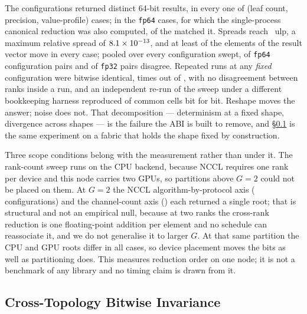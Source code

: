 \documentclass[journal,10pt]{IEEEtran}
\theoremstyle{plain}
\theoremstyle{definition}
\theoremstyle{remark}
\newcommand{\sv}[1]{\texttt{#1}}
\begin{document}
The \GpuWorldSizes{} configurations returned \GpuRootsDistinct{} distinct
64-bit results, in every one of \GpuCases{} (leaf count, precision,
value-profile) cases; in the \GpuCanonCases{} \sv{fp64} cases, for which the
single-process canonical reduction was also computed, \GpuEqCanonical{} of the
\GpuWorldSizes{} matched it. Spreads reach \GpuUlpMax{}~ulp, a maximum
relative spread of $8.1\times10^{-13}$, and at least \GpuElemsMovedMin{} of the
\GpuElemsTotal{} elements of the result vector move in every case; pooled over
every configuration swept, \GpuPairDblPct{} of \sv{fp64} configuration pairs
and \GpuPairSglPct{} of \sv{fp32} pairs disagree. Repeated runs at any \emph{fixed} configuration
were bitwise identical, \GpuRepeats{} times out of \GpuRepeats{}, with no
disagreement between ranks inside a run, and an independent re-run of the
sweep under a different bookkeeping harness reproduced \GpuXCheck{} of
\GpuXCheck{} common cells bit for bit. Reshape moves the answer; noise does
not. That decomposition --- determinism at a fixed shape, divergence across
shapes --- is the failure the ABI is built to remove, and
\S\ref{sec:results-invariance} is the same experiment on a fabric that holds
the shape fixed by construction.

Three scope conditions belong with the measurement rather than under it.
The rank-count sweep runs on the CPU backend, because NCCL requires one rank
per device and this node carries two GPUs, so partitions above $G{=}2$ could
not be placed on them. At $G{=}2$ the NCCL algorithm-by-protocol axis
(\GpuLibCfgs{} configurations) and the channel-count axis (\GpuChanCfgs{})
each returned a single root; that is structural and not an empirical null,
because at two ranks the cross-rank reduction is one floating-point addition
per element and no schedule can reassociate it, and we do not generalise it to
larger $G$. At that same partition the CPU and GPU roots differ in all
\GpuCases{} cases, so device placement moves the bits as well as partitioning
does. This measures reduction order on one node; it is not a benchmark of any
library and no timing claim is drawn from it.

\subsection{Cross-Topology Bitwise Invariance}\label{sec:results-invariance}
\end{document}
